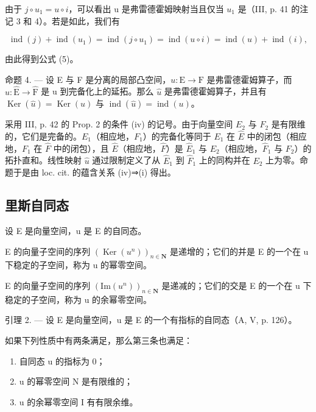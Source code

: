 由于 \(j \circ u_{1} = u \circ i\)，可以看出 u 是弗雷德霍姆映射当且仅当 \(u_{1}\) 是（III, p. 41 的注记 3 和 4）。若是如此，我们有

\[
\operatorname{ind} (j) + \operatorname{ind} (u _ {1}) = \operatorname{ind} (j \circ u _ {1}) = \operatorname{ind} (u \circ i) = \operatorname{ind} (u) + \operatorname{ind} (i),
\]

由此得到公式 (5)。

命题 4. --- 设 E 与 F 是分离的局部凸空间，\(u: \mathrm{E} \to \mathrm{F}\) 是弗雷德霍姆算子，而 \(\widehat{u}: \widehat{\mathrm{E}} \to \widehat{\mathrm{F}}\) 是 u 到完备化上的延拓。那么 \(\widehat{u}\) 是弗雷德霍姆算子，并且有 \(\operatorname{Ker}(\widehat{u}) = \operatorname{Ker}(u)\) 与 \(\operatorname{ind}(\widehat{u}) = \operatorname{ind}(u)\)。

采用 III, p. 42 的 Prop. 2 的条件 (iv) 的记号。由于向量空间 \(E_{2}\) 与 \(F_{2}\) 是有限维的，它们是完备的。\(E_{1}\)（相应地，\(F_{1}\)）的完备化等同于 \(E_{1}\) 在 \(\widehat{E}\) 中的闭包（相应地，\(F_{1}\) 在 \(\widehat{F}\) 中的闭包），且 \(\widehat{E}\)（相应地，\(\widehat{F}\)）是 \(\widehat{E}_{1}\) 与 \(E_{2}\)（相应地，\(\widehat{F}_{1}\) 与 \(F_{2}\)）的拓扑直和。线性映射 \(\widehat{u}\) 通过限制定义了从 \(\widehat{E}_{1}\) 到 \(\widehat{F}_{1}\) 上的同构并在 \(E_{2}\) 上为零。命题于是由 loc. cit. 的蕴含关系 (iv)⇒(i) 得出。

\subsection{里斯自同态}

设 E 是向量空间，u 是 E 的自同态。

E 的向量子空间的序列 \((\operatorname{Ker}(u^{n}))_{n\in\mathbf{N}}\) 是递增的；它们的并是 E 的一个在 u 下稳定的子空间，称为 u 的幂零空间。

E 的向量子空间的序列 \((\mathrm{Im}(u^{n}))_{n\in\mathbf{N}}\) 是递减的；它们的交是 E 的一个在 u 下稳定的子空间，称为 u 的余幂零空间。

引理 2. --- 设 E 是向量空间，u 是 E 的一个有指标的自同态（A, V, p. 126）。

如果下列性质中有两条满足，那么第三条也满足：

\begin{enumerate}
\def\labelenumi{(\roman{enumi})}
\item
  自同态 u 的指标为 0；
\item
  u 的幂零空间 N 是有限维的；
\item
  u 的余幂零空间 I 有有限余维。
\end{enumerate}

